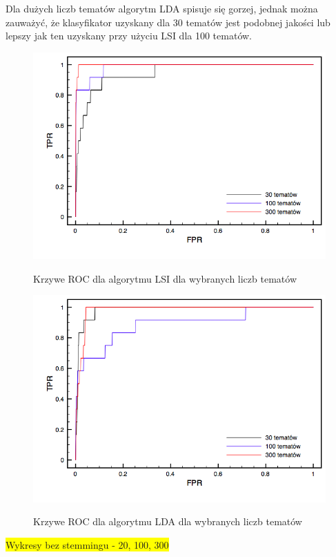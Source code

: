 \documentclass[11pt,a4paper]{article}
\newcommand{\todo}[1]{\colorbox{yellow}{#1}}
\begin{document}
Dla dużych liczb tematów algorytm LDA spisuje się gorzej, jednak można
zauważyć, że klasyfikator uzyskany dla 30 tematów jest podobnej jakości lub
lepszy jak ten uzyskany przy użyciu LSI dla 100 tematów.

\begin{figure}[h]
\caption{Krzywe ROC dla algorytmu LSI dla wybranych liczb tematów}
\includegraphics[width=\linewidth]{gfx/lsi_roc.png}
\label{roc_lsi}
\end{figure}

\begin{figure}[h]
\caption{Krzywe ROC dla algorytmu LDA dla wybranych liczb tematów}
\includegraphics[width=\linewidth]{gfx/lda_roc.png}
\label{roc_lda}
\end{figure}

\todo{Wykresy bez stemmingu - 20, 100, 300}
\end{document}
